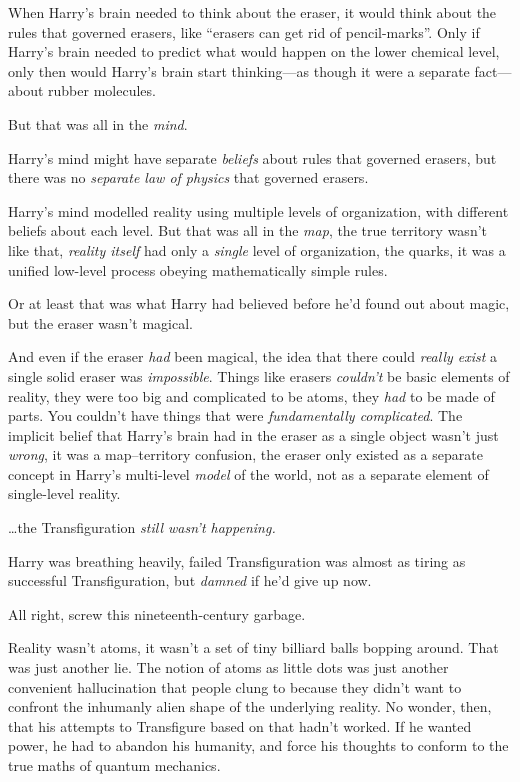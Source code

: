 When Harry’s brain needed to think about the eraser, it would think about the rules that governed erasers, like “erasers can get rid of pencil-marks”. Only if Harry’s brain needed to predict what would happen on the lower chemical level, only then would Harry’s brain start thinking—as though it were a separate fact—about rubber molecules.

But that was all in the \emph{mind}.

Harry’s mind might have separate \emph{beliefs} about rules that governed erasers, but there was no \emph{separate law of physics} that governed erasers.

Harry’s mind modelled reality using multiple levels of organization, with different beliefs about each level. But that was all in the \emph{map}, the true territory wasn’t like that, \emph{reality itself} had only a \emph{single} level of organization, the quarks, it was a unified low-level process obeying mathematically simple rules.

Or at least that was what Harry had believed before he’d found out about magic, but the eraser wasn’t magical.

And even if the eraser \emph{had} been magical, the idea that there could \emph{really exist} a single solid eraser was \emph{impossible}. Things like erasers \emph{couldn’t} be basic elements of reality, they were too big and complicated to be atoms, they \emph{had} to be made of parts. You couldn’t have things that were \emph{fundamentally complicated}. The implicit belief that Harry’s brain had in the eraser as a single object wasn’t just \emph{wrong}, it was a map–territory confusion, the eraser only existed as a separate concept in Harry’s multi-level \emph{model} of the world, not as a separate element of single-level reality.

…the Transfiguration \emph{still wasn’t happening.}

Harry was breathing heavily, failed Transfiguration was almost as tiring as successful Transfiguration, but \emph{damned} if he’d give up now.

All right, screw this nineteenth-century garbage.

Reality wasn’t atoms, it wasn’t a set of tiny billiard balls bopping around. That was just another lie. The notion of atoms as little dots was just another convenient hallucination that people clung to because they didn’t want to confront the inhumanly alien shape of the underlying reality. No wonder, then, that his attempts to Transfigure based on that hadn’t worked. If he wanted power, he had to abandon his humanity, and force his thoughts to conform to the true maths of quantum mechanics.

